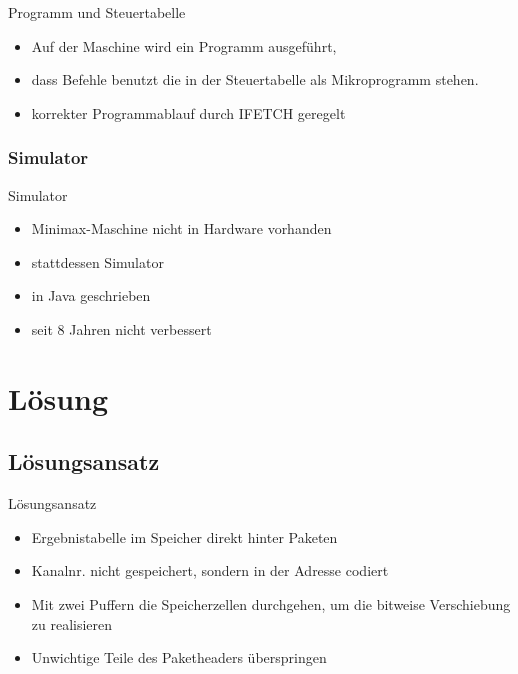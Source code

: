 \documentclass{beamer}
\begin{document}
\begin{frame}{Programm und Steuertabelle}
\begin{itemize}
    \item Auf der Maschine wird ein Programm ausgeführt,
    \item dass Befehle benutzt die in der Steuertabelle als Mikroprogramm stehen.
    \item korrekter Programmablauf durch IFETCH geregelt
\end{itemize}
\end{frame}

\subsubsection{Simulator}



\begin{frame}{Simulator}
\begin{itemize}
    \item Minimax-Maschine nicht in Hardware vorhanden
    \item stattdessen Simulator
    \item in Java geschrieben
    \item seit 8 Jahren nicht verbessert
\end{itemize}
\end{frame}



\section{Lösung}

\subsection{Lösungsansatz}






\begin{frame}{Lösungsansatz}
\begin{itemize}
    \item Ergebnistabelle im Speicher direkt hinter Paketen
    \item Kanalnr. nicht gespeichert, sondern in der Adresse codiert
    \item Mit zwei Puffern die Speicherzellen durchgehen, um die bitweise Verschiebung zu realisieren
    \item Unwichtige Teile des Paketheaders überspringen
\end{itemize}
\end{frame}
\end{document}
